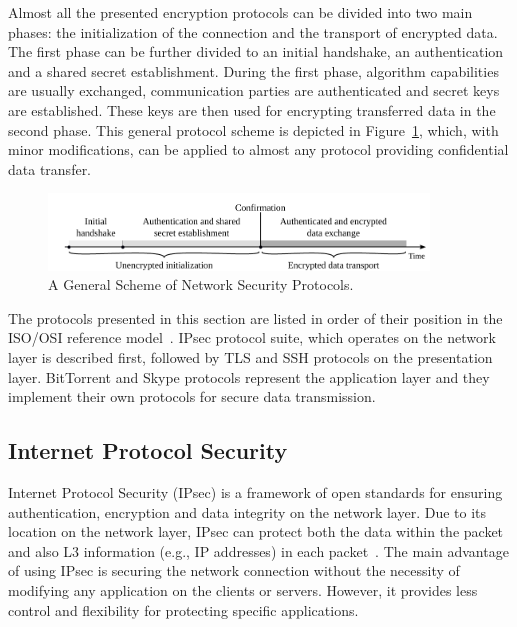 Almost all the presented encryption protocols can be divided into two main phases: the initialization of the connection and the transport of encrypted data. The first phase can be further divided to an initial handshake, an authentication and a shared secret establishment. During the first phase, algorithm capabilities are usually exchanged, communication parties are authenticated and secret keys are established. These keys are then used for encrypting transferred data in the second phase. This general protocol scheme is depicted in Figure~\ref{fig:protocols-scheme}, which, with minor modifications, can be applied to almost any protocol providing confidential data transfer.

\begin{figure}[!ht]
	\begin{center}
		\includegraphics[width=0.9\textwidth]{figures/paper-encrypted/protocols_scheme}
		\caption{A General Scheme of Network Security Protocols.}
		\label{fig:protocols-scheme}
	\end{center}
\end{figure}

The protocols presented in this section are listed in order of their position in the ISO/OSI reference model~\cite{ISO7948-1}. IPsec protocol suite, which operates on the network layer is described first, followed by TLS and SSH protocols on the presentation layer. BitTorrent and Skype protocols represent the application layer and they implement their own protocols for secure data transmission.



\subsection{Internet Protocol Security}

Internet Protocol Security (IPsec) is a framework of open standards for ensuring authentication, encryption and data integrity on the network layer. Due to its location on the network layer, IPsec can protect both the data within the packet and also L3 information (e.g., IP addresses) in each packet~\cite{SP-800-77}. The main advantage of using IPsec is securing the network connection without the necessity of modifying any application on the clients or servers. However, it provides less control and flexibility for protecting specific applications.

